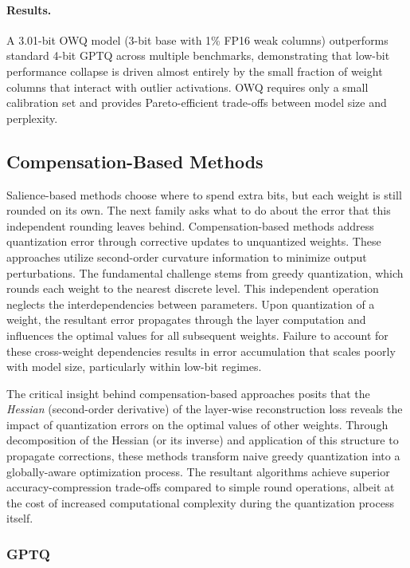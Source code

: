 \paragraph{Results.}
A 3.01-bit OWQ model (3-bit base with 1\% FP16 weak columns) outperforms standard 4-bit GPTQ across multiple benchmarks, demonstrating that low-bit performance collapse is driven almost entirely by the small fraction of weight columns that interact with outlier activations. OWQ requires only a small calibration set and provides Pareto-efficient trade-offs between model size and perplexity.

\subsection{Compensation-Based Methods}

Salience-based methods choose where to spend extra bits, but each weight is still rounded on its own. The next family asks what to do about the error that this independent rounding leaves behind. Compensation-based methods address quantization error through corrective updates to unquantized weights. These approaches utilize second-order curvature information to minimize output perturbations. The fundamental challenge stems from greedy quantization, which rounds each weight to the nearest discrete level. This independent operation neglects the interdependencies between parameters. Upon quantization of a weight, the resultant error propagates through the layer computation and influences the optimal values for all subsequent weights. Failure to account for these cross-weight dependencies results in error accumulation that scales poorly with model size, particularly within low-bit regimes.

The critical insight behind compensation-based approaches posits that the \textit{Hessian} (second-order derivative) of the layer-wise reconstruction loss reveals the impact of quantization errors on the optimal values of other weights. Through decomposition of the Hessian (or its inverse) and application of this structure to propagate corrections, these methods transform naive greedy quantization into a globally-aware optimization process. The resultant algorithms achieve superior accuracy-compression trade-offs compared to simple round operations, albeit at the cost of increased computational complexity during the quantization process itself.

\subsubsection{GPTQ \cite{frantar2022gptq}}

